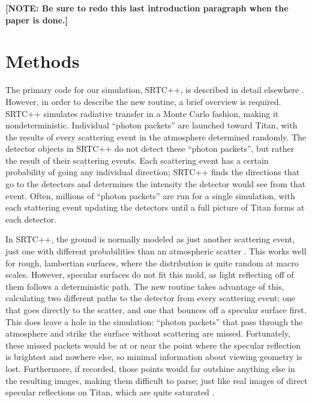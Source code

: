 \documentclass[twocolumn,linenumbers]{aastex631}
\begin{document}
\textbf{\color{red} [NOTE: Be sure to redo this last introduction paragraph when the paper is done.] \color{black}}

\section{Methods} \label{sec:methods}

The primary code for our simulation, SRTC++, is described in detail elsewhere \citep{Barnes2018}. However, in order to describe the new routine, a brief overview is required. SRTC++ simulates radiative transfer in a Monte Carlo fashion, making it nondeterministic. Individual ``photon packets'' are launched toward Titan, with the results of every scattering event in the atmosphere determined randomly. The detector objects in SRTC++ do not detect these ``photon packets'', but rather the result of their scattering events. Each scattering event has a certain probability of going any individual direction; SRTC++ finds the directions that go to the detectors and determines the intensity the detector would see from that event. Often, millions of ``photon packets'' are run for a single simulation, with each stattering event updating the detectors until a full picture of Titan forms at each detector.

In SRTC++, the ground is normally modeled as just another scattering event, just one with different probabilities than an atmospheric scatter \citep{Barnes2018}. This works well for rough, lambertian surfaces, where the distribution is quite random at macro scales. However, specular surfaces do not fit this mold, as light reflecting off of them follows a deterministic path.  The new routine takes advantage of this, calculating two different paths to the detector from every scattering event; one that goes directly to the scatter, and one that bounces off a specular surface first. This does leave a hole in the simulation: ``photon packets'' that pass through the atmosphere and strike the surface without scattering are missed. Fortunately, these missed packets would be at or near the point where the specular reflection is brightest and nowhere else, so minimal information about viewing geometry is lost. Furthermore, if recorded, those points would far outshine anything else in the resulting images, making them difficult to parse; just like real images of direct specular reflections on Titan, which are quite saturated \citep{Barnes2013}.
\end{document}
